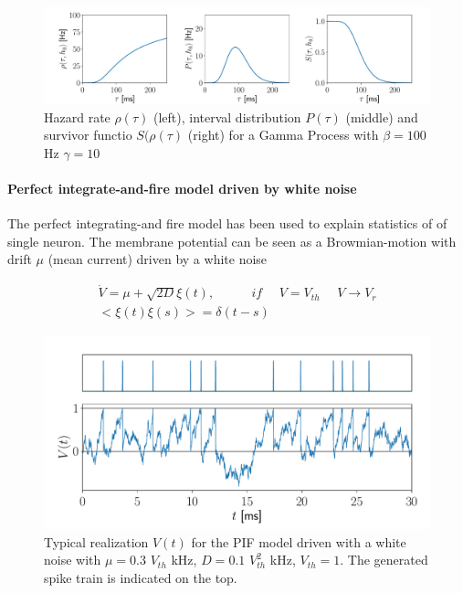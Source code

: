 \documentclass[a4paper,11pt,twoside]{article}
\numberwithin{equation}{section}
\begin{document}
\begin{figure}[h!]
	\includegraphics[width=\linewidth]{gamma.pdf}
	\caption{Hazard rate $\rho(\tau)$ (left), interval distribution $P(\tau)$ (middle) and survivor functio $S(\rho(\tau)$ (right) for a Gamma Process with $\beta=100$ Hz
		$\gamma=10$ }
	\label{fig:gammaprocess}
\end{figure}

\paragraph{Perfect integrate-and-fire model driven by white noise}
\label{sec:pif}
The perfect integrating-and fire model has been used  to explain statistics of of single neuron. The membrane potential can be seen as a Browmian-motion with drift $\mu$ (mean current) driven by a white noise


\begin{align}
\label{eq:Vxi}
\dot V=\mu +\sqrt{2D}\xi(t), \:\:\:\:\:\:\:\: \:\:\:\:\: if\:\:\:\:\:\:  V=V_{th}\:\:\:\:\:\:V\rightarrow V_r\\ 
<\xi(t)\xi(s)>=\delta(t-s)
\end{align}

\begin{figure}[h!]
	\centering
	\includegraphics[width=0.8\linewidth]{PIF_V}
	\caption{Typical realization $V(t)$ for the PIF model driven with a white noise with $\mu=0.3$ $V_{th}$ kHz, $D=0.1$ $V_{th}^2$ kHz, $V_{th}=1$. The generated spike train is indicated on the top.
	}
	\label{fig:PIF_V}
\end{figure}
\end{document}
